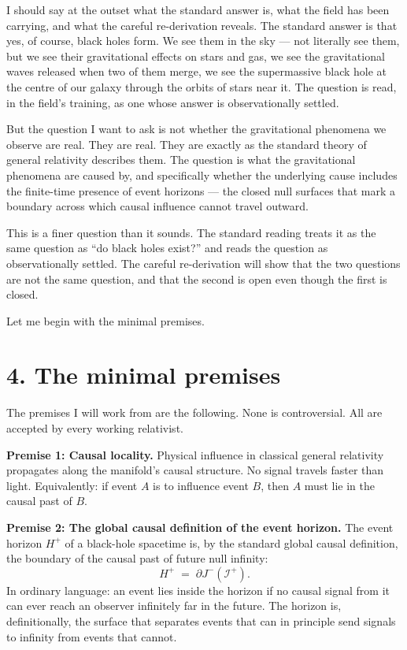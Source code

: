 \documentclass[11pt,a4paper]{article}
\begin{document}
I should say at the outset what the standard answer is, what the field has been carrying, and what the careful re-derivation reveals. The standard answer is that yes, of course, black holes form. We see them in the sky --- not literally see them, but we see their gravitational effects on stars and gas, we see the gravitational waves released when two of them merge, we see the supermassive black hole at the centre of our galaxy through the orbits of stars near it. The question is read, in the field's training, as one whose answer is observationally settled.

But the question I want to ask is not whether the gravitational phenomena we observe are real. They are real. They are exactly as the standard theory of general relativity describes them. The question is what the gravitational phenomena are caused by, and specifically whether the underlying cause includes the finite-time presence of event horizons --- the closed null surfaces that mark a boundary across which causal influence cannot travel outward.

This is a finer question than it sounds. The standard reading treats it as the same question as ``do black holes exist?'' and reads the question as observationally settled. The careful re-derivation will show that the two questions are not the same question, and that the second is open even though the first is closed.

Let me begin with the minimal premises.

\section*{4. The minimal premises}

The premises I will work from are the following. None is controversial. All are accepted by every working relativist.

\textbf{Premise 1: Causal locality.} Physical influence in classical general relativity propagates along the manifold's causal structure. No signal travels faster than light. Equivalently: if event $A$ is to influence event $B$, then $A$ must lie in the causal past of $B$.

\textbf{Premise 2: The global causal definition of the event horizon.} The event horizon $H^+$ of a black-hole spacetime is, by the standard global causal definition, the boundary of the causal past of future null infinity:
\[ H^+ \;=\; \partial J^-(\mathscr{I}^+). \]
In ordinary language: an event lies inside the horizon if no causal signal from it can ever reach an observer infinitely far in the future. The horizon is, definitionally, the surface that separates events that can in principle send signals to infinity from events that cannot.
\end{document}
